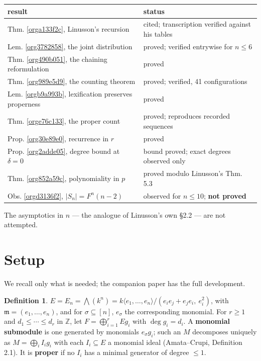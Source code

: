 \documentclass[11pt, a4paper, abstract=yes]{scrartcl}
\theoremstyle{definition}
\newtheorem{definition}{Definition}
\theoremstyle{remark}
\theoremstyle{plain}
\begin{document}
\begin{center}
\small
\begin{tabular}{ll}
result & status\\
\hline
Thm. \ref{orga133f2c}, Linusson's recursion & cited; transcription verified against his tables\\
Lem. \ref{org3782858}, the joint distribution & proved; verified entrywise for \(n\le6\)\\
Thm. \ref{org490b051}, the chaining reformulation & proved\\
Thm. \ref{org989e5d9}, the counting theorem & proved; verified, 41 configurations\\
Lem. \ref{orgb9a993b}, lexification preserves properness & proved\\
Thm. \ref{orge76c133}, the proper count & proved; reproduces recorded sequences\\
Prop. \ref{org30e89e0}, recurrence in \(r\) & proved\\
Prop. \ref{org2adde05}, degree bound at \(\delta=0\) & bound proved; exact degrees observed only\\
Thm. \ref{org852a59c}, polynomiality in \(p\) & proved modulo Linusson's Thm. 5.3\\
Obs. \ref{orgd3136f2}, \(\lvert S_n\rvert=F^n(n-2)\) & observed for \(n\le10\); \textbf{not proved}\\
\end{tabular}
\end{center}

The asymptotics in \(n\) --- the analogue of Linusson's own \S2.2 --- are not attempted.
\section{Setup}
\label{sec:orgbfff9fc}
We recall only what is needed; the companion paper has the full development.

\begin{definition}
\(E=E_n=\bigwedge(k^n)=k\langle e_1,\dots,e_n\rangle/(e_ie_j+e_je_i,\ e_i^2)\), with
\(\mathfrak m=(e_1,\dots,e_n)\), and for \(\sigma\subseteq[n]\), \(e_\sigma\) the corresponding
monomial. For \(r\ge1\) and \(d_1\le\cdots\le d_r\) in \(\mathbb Z\), let
\(F=\bigoplus_{i=1}^rEg_i\) with \(\deg g_i=d_i\). A \textbf{monomial submodule} is one generated by
monomials \(e_\sigma g_i\); such an \(M\) decomposes uniquely as \(M=\bigoplus_iI_ig_i\) with each
\(I_i\subseteq E\) a monomial ideal (Amata--Crupi, Definition 2.1). It is \textbf{proper} if no \(I_i\) has
a minimal generator of degree \(\le1\).
\label{orgd425f1c}
\end{definition}
\end{document}

